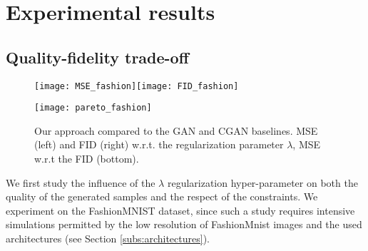 \section{Experimental results}\label{sec:results}

\subsection{Quality-fidelity trade-off}



\begin{figure}[t]
	\centering
	\texttt{[image: MSE\_fashion]}\texttt{[image: FID\_fashion]}
	
	\texttt{[image: pareto\_fashion]}
	
	\centering
	\caption{Our approach compared to the GAN and CGAN baselines. MSE (left) and  FID (right) w.r.t. the regularization parameter $\lambda$, MSE w.r.t the FID (bottom).
	}
	\label{fig:fids}
	\label{fig:mses}
	\label{fig:paretos}
\end{figure}

We first study the influence of the $\lambda$ regularization hyper-parameter on both the quality of the generated samples and the respect of the constraints. We experiment on the %
FashionMNIST \cite{Xiao2017} dataset, since such a study requires intensive simulations permitted by the low resolution of FashionMnist images and the used architectures (see Section \ref{subs:architectures}). 

